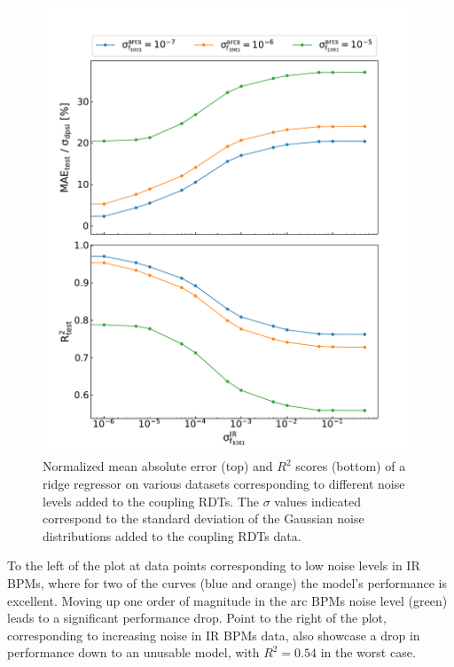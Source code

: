 \begin{figure}[!htb]
    \centering
    \includegraphics*[width=0.99\textwidth]{Figures/ML_for_IR_Coupling/ml_ridge_performance.pdf}
    \caption{Normalized mean absolute error (top) and \(R^2\) scores (bottom) of a ridge regressor on various datasets corresponding to different noise levels added to the coupling RDTs. The \(\sigma\) values indicated correspond to the standard deviation of the Gaussian noise distributions added to the coupling RDTs data.}
    \label{figure:ridge_performance}
\end{figure}

To the left of the plot at data points corresponding to low noise levels in IR BPMs, where for two of the curves (\textcolor{mplblue}{blue} and \textcolor{mplorange}{orange}) the model's performance is excellent.
Moving up one order of magnitude in the arc BPMs noise level (\textcolor{mplgreen}{green}) leads to a significant performance drop.
Point to the right of the plot, corresponding to increasing noise in IR BPMs data, also showcase a drop in performance down to an unusable model, with \(R^2 = 0.54\) in the worst case.

